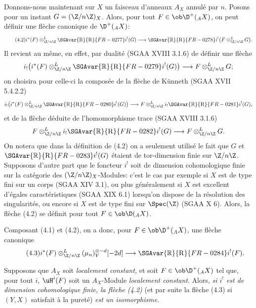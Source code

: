 Donnons-nous maintenant sur $X$ un faisceau d'anneaux $A_X$ annulé par $n$. Posons pour un instant $G=(\Z/n\Z)_X$. Alors, pour tout $F\in\ob\D^+({}_A X)$, on peut définir une flèche canonique de $\D^+({}_A X)$:
\begin{equation}\tag{4.2}
        i^*(F)\otimes^L_{\Z/n\Z} \SGAvar{\mathbb{R}}{\mathrm{R}}{FR-0277} i^!(G)\longrightarrow \SGAvar{\mathbb{R}}{\mathrm{R}}{FR-0278} i^!\bigl(F\otimes^L_{\Z/n\Z}G\bigr).
\end{equation}
Il revient au même, en effet, par dualité (SGAA XVIII 3.1.6) de définir une flèche
\[
        i_!\bigl(i^*(F)\otimes^L_{\Z/n\Z}\SGAvar{\mathbb{R}}{\mathrm{R}}{FR-0279} i^!(G)\bigr)\longrightarrow F\otimes^L_{\Z/n\Z}G;
\]
on choisira pour celle-ci la composée de la flèche de Künneth (SGAA XVII 5.4.2.2)
\[
        i_!\bigl(i^*(F)\otimes^L_{\Z/n\Z}\SGAvar{\mathbb{R}}{\mathrm{R}}{FR-0280} i^!(G)\bigr)\longrightarrow F\otimes^L_{\Z/n\Z}i_!\SGAvar{\mathbb{R}}{\mathrm{R}}{FR-0281} i^!(G),
\]
et de la flèche déduite de l'homomorphisme trace (SGAA XVIII 3.1.6)
\[
        F\otimes^L_{\Z/n\Z}i_!\SGAvar{\mathbb{R}}{\mathrm{R}}{FR-0282} i^!(G)\longrightarrow F\otimes^L_{\Z/n\Z}G.
\]
On notera que dans la définition de (4.2) on a seulement utilisé le fait que $G$ et $\SGAvar{\mathbb{R}}{\mathrm{R}}{FR-0283} i^!(G)$ étaient de tor-dimension finie sur $\Z/n\Z$. Supposons d'autre part que le foncteur $i^!$ soit de dimension cohomologique finie sur la catégorie des $(\Z/n\Z)_X$-Modules: c'est le cas par exemple si $X$ est de type fini sur un corps (SGAA XIV 3.1), ou plus généralement si $X$ est excellent d'égales caractéristiques (SGAA XIX 6.1) lorsqu'on dispose de la résolution des singularités, ou encore si $X$ est de type fini sur $\Spec(\Z)$ (SGAA X 6). Alors, la flèche (4.2) se définit pour tout $F\in\ob\D({}_A X)$.

Composant (4.1) et (4.2), on a donc, pour $F\in\ob\D^+({}_A X)$, une flèche canonique
\begin{equation}\tag{4.3}
        i^*(F)\otimes^L_{\Z/n\Z}(\mu_n)_Y^{\otimes -d}[-2d]\longrightarrow \SGAvar{\mathbb{R}}{\mathrm{R}}{FR-0284} i^!(F).
\end{equation}

Supposons que $A_X$ soit \emph{localement constant,} et soit $F\in\ob\D^+({}_A X)$ tel que, pour tout $i$, $\uH^i(F)$ soit un $A_X$-Module \emph{localement constant}. Alors, \emph{si $i^!$ est de dimension cohomologique finie, la flèche (4.2)} (et par suite la flèche (4.3) si $(Y,X)$ satisfait à la pureté) \emph{est un isomorphisme}.

